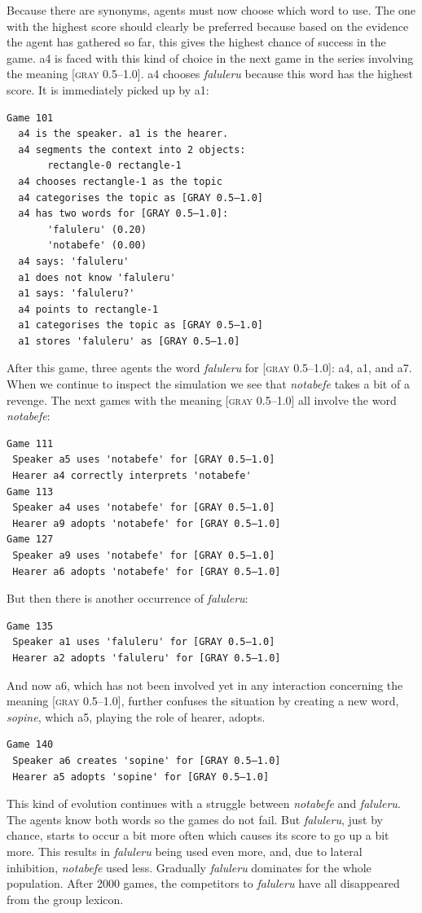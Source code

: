 Because there are synonyms, agents must now choose
which word to use. The one with the highest
score should clearly be preferred because based on the
evidence the agent has gathered so far, this
gives the highest chance of success in the game. {\bfshape  a4}
is faced with this kind of choice in 
the next game in the series involving the meaning
{}[\textsc{gray} 0.5–1.0]. {\bfshape  a4} chooses \textit{faluleru} because this 
word has the highest score. It is immediately picked up by 
{\bfshape  a1}: 
\begin{verbatim}
Game 101
  a4 is the speaker. a1 is the hearer. 
  a4 segments the context into 2 objects: 
       rectangle-0 rectangle-1
  a4 chooses rectangle-1 as the topic 
  a4 categorises the topic as [GRAY 0.5–1.0]
  a4 has two words for [GRAY 0.5–1.0]:
       'faluleru' (0.20)
       'notabefe' (0.00)
  a4 says: 'faluleru'
  a1 does not know 'faluleru'
  a1 says: 'faluleru?'
  a4 points to rectangle-1
  a1 categorises the topic as [GRAY 0.5–1.0]
  a1 stores 'faluleru' as [GRAY 0.5–1.0]
\end{verbatim}
After this game, three agents  the word 
\textit{faluleru} for [\textsc{gray} 0.5–1.0]: {\bfshape  a4}, {\bfshape  a1}, 
and {\bfshape  a7}. When we continue to inspect the
simulation we see that \textit{notabefe} takes a bit of 
a revenge. The next games with the 
meaning [\textsc{gray} 0.5–1.0] all involve the word \textit{notabefe}: 

\begin{verbatim}
Game 111
 Speaker a5 uses 'notabefe' for [GRAY 0.5–1.0]
 Hearer a4 correctly interprets 'notabefe'
Game 113
 Speaker a4 uses 'notabefe' for [GRAY 0.5–1.0]
 Hearer a9 adopts 'notabefe' for [GRAY 0.5–1.0]
Game 127
 Speaker a9 uses 'notabefe' for [GRAY 0.5–1.0]
 Hearer a6 adopts 'notabefe' for [GRAY 0.5–1.0]
\end{verbatim}
But then there is another occurrence of \textit{faluleru}: 
\begin{verbatim}
Game 135 
 Speaker a1 uses 'faluleru' for [GRAY 0.5–1.0]
 Hearer a2 adopts 'faluleru' for [GRAY 0.5–1.0]
\end{verbatim}
And now {\bfshape  a6}, which has not been involved 
yet in any interaction concerning the 
meaning [\textsc{gray} 0.5–1.0], further confuses the situation by 
creating a new word, \textit{sopine}, which {\bfshape  a5}, playing
the role of hearer, adopts. 
\begin{verbatim}
Game 140
 Speaker a6 creates 'sopine' for [GRAY 0.5–1.0]
 Hearer a5 adopts 'sopine' for [GRAY 0.5–1.0]
\end{verbatim}
This kind of evolution continues with a struggle between 
\textit{notabefe} and \textit{faluleru}. The agents know both 
words so the games do not fail. But \textit{faluleru}, 
just by chance, starts to occur a bit more often
which causes its score to go up a bit more. 
This results in \textit{faluleru} being used even more, 
and, due to lateral inhibition, \textit{notabefe} used 
less. Gradually \textit{faluleru} dominates for 
the whole population. 
After 2000 games, the competitors to \textit{faluleru} have 
all disappeared from the group lexicon. 

